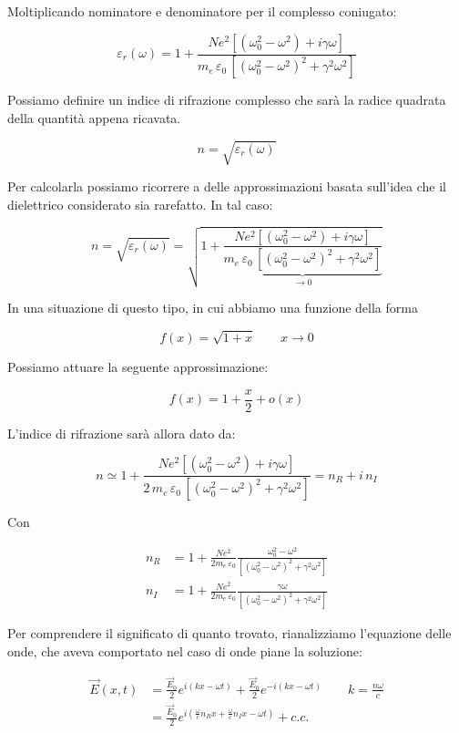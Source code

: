 Moltiplicando nominatore e denominatore per il complesso coniugato:

\[
	\varepsilon_r (\omega) = 1 + \frac{Ne^2 \left[ (\omega_0^2 -\omega^2) + i\gamma\omega  \right]}{m_e\,\varepsilon_0\,\left[ (\omega_0^2 -\omega^2)^2 +\gamma^2 \omega^2 \right]}
\]

Possiamo definire un indice di rifrazione complesso che sarà la radice quadrata della quantità appena ricavata.

\[
	n = \sqrt{\varepsilon_r (\omega)}
\]

Per calcolarla possiamo ricorrere a delle approssimazioni basata sull'idea che il dielettrico considerato sia rarefatto. In tal caso:

\[
	n=\sqrt{\varepsilon_r (\omega)} = \sqrt{1 + \underbrace{\frac{Ne^2 \left[ (\omega_0^2 -\omega^2) + i\gamma\omega  \right]}{m_e\,\varepsilon_0\,\left[ (\omega_0^2 -\omega^2)^2 +\gamma^2 \omega^2 \right]}}_{\to 0}}
\]

In una situazione di questo tipo, in cui abbiamo una funzione della forma

\[
	f(x) = \sqrt{1+x} \qquad x\to 0
\]

Possiamo attuare la seguente approssimazione:

\[
	f(x) = 1 + \frac{x}{2} + o(x)
\]

L'indice di rifrazione sarà allora dato da:

\[
	n \simeq 1 + \frac{Ne^2 \left[ (\omega_0^2 -\omega^2) + i\gamma\omega  \right]}{2\,m_e\,\varepsilon_0\,\left[ (\omega_0^2 -\omega^2)^2 +\gamma^2 \omega^2 \right]} = n_R + i\,n_I
\]

Con

\begin{align*}
	n_R &= 1 + \frac{Ne^2}{2m_e\,\varepsilon_0}\frac{\omega_0^2 -\omega^2}{\left[ (\omega_0^2 -\omega^2)^2 +\gamma^2 \omega^2 \right]} \\
	n_I &= 1 + \frac{Ne^2}{2m_e\,\varepsilon_0}\frac{\gamma \omega}{\left[ (\omega_0^2 -\omega^2)^2 +\gamma^2 \omega^2 \right]}
\end{align*}

Per comprendere il significato di quanto trovato, rianalizziamo l'equazione delle onde, che aveva comportato nel caso di onde piane la soluzione:

\begin{equation*}
	\begin{aligned}
		\vec{E} (x,t) &= \frac{\vec{E}_0}{2}e^{i(kx-\omega t)} + \frac{\vec{E}_0}{2}e^{-i(kx-\omega t)} \qquad k = \frac{n\omega}{c} \\
		&=\frac{\vec{E}_0}{2}e^{i\left( \frac{\omega}{c}n_Rx + \frac{\omega}{c}n_Ix - \omega t   \right)} + c.c.
	\end{aligned}
\end{equation*}

